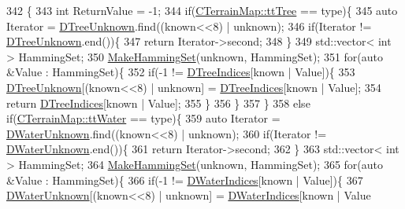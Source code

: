 \begin{DoxyCode}
342                                                                               \{
343     \textcolor{keywordtype}{int} ReturnValue = -1;
344     \textcolor{keywordflow}{if}(\hyperlink{classCTerrainMap_aff2ab991e237269941416dd79d8871d4a15600fc22dc08ff5a3aec20930112f8c}{CTerrainMap::ttTree} == type)\{
345         \textcolor{keyword}{auto} Iterator = \hyperlink{classCMapRenderer_a55024ab05d176fcc6b60031aef47e1c8}{DTreeUnknown}.find((known<<8) | unknown);
346         \textcolor{keywordflow}{if}(Iterator != \hyperlink{classCMapRenderer_a55024ab05d176fcc6b60031aef47e1c8}{DTreeUnknown}.end())\{
347             \textcolor{keywordflow}{return} Iterator->second;
348         \}
349         std::vector< int > HammingSet;
350         \hyperlink{classCMapRenderer_a0b06ba89b9a7ad75fa945a3c22dc019a}{MakeHammingSet}(unknown, HammingSet);
351         \textcolor{keywordflow}{for}(\textcolor{keyword}{auto} &Value : HammingSet)\{
352             \textcolor{keywordflow}{if}(-1 != \hyperlink{classCMapRenderer_a56708493a1499c671f4378204a0bfcb2}{DTreeIndices}[known | Value])\{
353                 \hyperlink{classCMapRenderer_a55024ab05d176fcc6b60031aef47e1c8}{DTreeUnknown}[(known<<8) | unknown] = \hyperlink{classCMapRenderer_a56708493a1499c671f4378204a0bfcb2}{DTreeIndices}[known | Value];
354                 \textcolor{keywordflow}{return} \hyperlink{classCMapRenderer_a56708493a1499c671f4378204a0bfcb2}{DTreeIndices}[known | Value];
355             \}
356         \}
357     \}
358     \textcolor{keywordflow}{else} \textcolor{keywordflow}{if}(\hyperlink{classCTerrainMap_aff2ab991e237269941416dd79d8871d4ab7c7a2abbef411fd768a4f209e307de5}{CTerrainMap::ttWater} == type)\{
359         \textcolor{keyword}{auto} Iterator = \hyperlink{classCMapRenderer_a4b2db86f9cb097d28e0bb3b29eb90194}{DWaterUnknown}.find((known<<8) | unknown);
360         \textcolor{keywordflow}{if}(Iterator != \hyperlink{classCMapRenderer_a4b2db86f9cb097d28e0bb3b29eb90194}{DWaterUnknown}.end())\{
361             \textcolor{keywordflow}{return} Iterator->second;
362         \}
363         std::vector< int > HammingSet;
364         \hyperlink{classCMapRenderer_a0b06ba89b9a7ad75fa945a3c22dc019a}{MakeHammingSet}(unknown, HammingSet);
365         \textcolor{keywordflow}{for}(\textcolor{keyword}{auto} &Value : HammingSet)\{
366             \textcolor{keywordflow}{if}(-1 != \hyperlink{classCMapRenderer_af82295ac61f841481490da6f2b433db2}{DWaterIndices}[known | Value])\{
367                 \hyperlink{classCMapRenderer_a4b2db86f9cb097d28e0bb3b29eb90194}{DWaterUnknown}[(known<<8) | unknown] = \hyperlink{classCMapRenderer_af82295ac61f841481490da6f2b433db2}{DWaterIndices}[known | Value

\end{DoxyCode}
